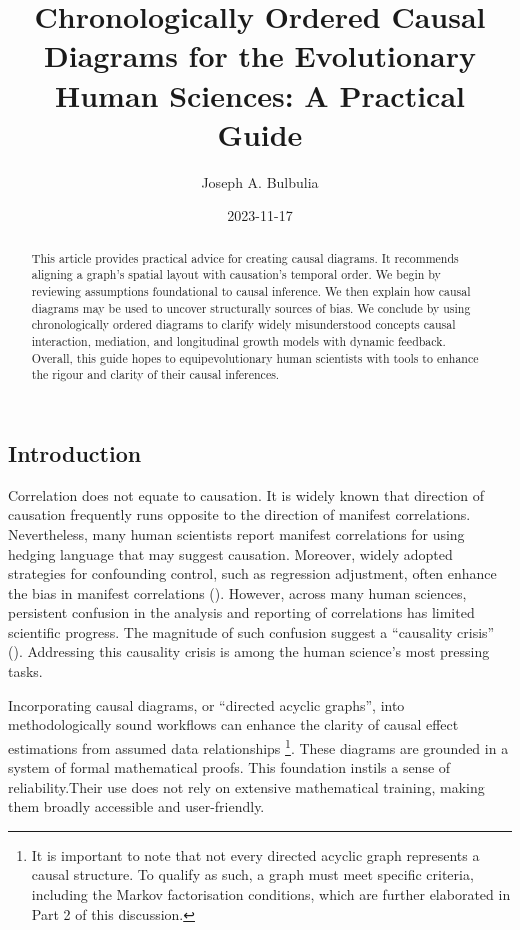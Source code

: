 \documentclass[
  singlecolumn,
  9pt]{article}
\title{Chronologically Ordered Causal Diagrams for the Evolutionary
Human Sciences: A Practical Guide}
\author{Joseph A. Bulbulia}
\affil{%
                  Victoria University of Wellington, New Zealand, School
                  of Psychology, Centre for Applied Cross-Cultural
                  Research
              }
\date{2023-11-17}
\begin{document}
\maketitle
\begin{abstract}
This article provides practical advice for creating causal diagrams. It
recommends aligning a graph's spatial layout with causation's temporal
order. We begin by reviewing assumptions foundational to causal
inference. We then explain how causal diagrams may be used to uncover
structurally sources of bias. We conclude by using chronologically
ordered diagrams to clarify widely misunderstood concepts causal
interaction, mediation, and longitudinal growth models with dynamic
feedback. Overall, this guide hopes to equipevolutionary human
scientists with tools to enhance the rigour and clarity of their causal
inferences.
\end{abstract}
\subsection{Introduction}\label{introduction}

Correlation does not equate to causation. It is widely known that
direction of causation frequently runs opposite to the direction of
manifest correlations. Nevertheless, many human scientists report
manifest correlations for using hedging language that may suggest
causation. Moreover, widely adopted strategies for confounding control,
such as regression adjustment, often enhance the bias in manifest
correlations (). However,
across many human sciences, persistent confusion in the analysis and
reporting of correlations has limited scientific progress. The magnitude
of such confusion suggest a ``causality crisis''
(). Addressing this causality
crisis is among the human science's most pressing tasks.

Incorporating causal diagrams, or ``directed acyclic graphs'', into
methodologically sound workflows can enhance the clarity of causal
effect estimations from assumed data relationships \footnote{It is
  important to note that not every directed acyclic graph represents a
  causal structure. To qualify as such, a graph must meet specific
  criteria, including the Markov factorisation conditions, which are
  further elaborated in Part 2 of this discussion.}. These diagrams are
grounded in a system of formal mathematical proofs. This foundation
instils a sense of reliability.Their use does not rely on extensive
mathematical training, making them broadly accessible and user-friendly.
\end{document}
